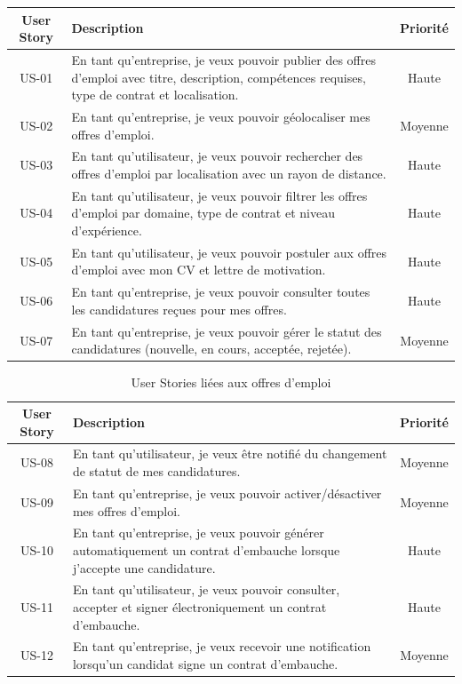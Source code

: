 \begin{table}[H]
\centering
\begin{tabularx}{\textwidth}{|c|X|c|}
\hline
\textbf{User Story} & \textbf{Description} & \textbf{Priorité} \\
\hline
US-01 & En tant qu'entreprise, je veux pouvoir publier des offres d'emploi avec titre, description, compétences requises, type de contrat et localisation. & Haute \\
\hline
US-02 & En tant qu'entreprise, je veux pouvoir géolocaliser mes offres d'emploi. & Moyenne \\
\hline
US-03 & En tant qu'utilisateur, je veux pouvoir rechercher des offres d'emploi par localisation avec un rayon de distance. & Haute \\
\hline
US-04 & En tant qu'utilisateur, je veux pouvoir filtrer les offres d'emploi par domaine, type de contrat et niveau d'expérience. & Haute \\
\hline
US-05 & En tant qu'utilisateur, je veux pouvoir postuler aux offres d'emploi avec mon CV et lettre de motivation. & Haute \\
\hline
US-06 & En tant qu'entreprise, je veux pouvoir consulter toutes les candidatures reçues pour mes offres. & Haute \\
\hline
US-07 & En tant qu'entreprise, je veux pouvoir gérer le statut des candidatures (nouvelle, en cours, acceptée, rejetée). & Moyenne \\
\hline
\end{tabularx}
\end{table}
\begin{table}[H]
\centering
\begin{tabularx}{\textwidth}{|c|X|c|}
\hline
\textbf{User Story} & \textbf{Description} & \textbf{Priorité} \\
\hline
US-08 & En tant qu'utilisateur, je veux être notifié du changement de statut de mes candidatures. & Moyenne \\
\hline
US-09 & En tant qu'entreprise, je veux pouvoir activer/désactiver mes offres d'emploi. & Moyenne \\
\hline
US-10 & En tant qu'entreprise, je veux pouvoir générer automatiquement un contrat d'embauche lorsque j'accepte une candidature. & Haute \\
\hline
US-11 & En tant qu'utilisateur, je veux pouvoir consulter, accepter et signer électroniquement un contrat d'embauche. & Haute \\
\hline
US-12 & En tant qu'entreprise, je veux recevoir une notification lorsqu'un candidat signe un contrat d'embauche. & Moyenne \\
\hline
\end{tabularx}
\caption{User Stories liées aux offres d'emploi}
\end{table}



